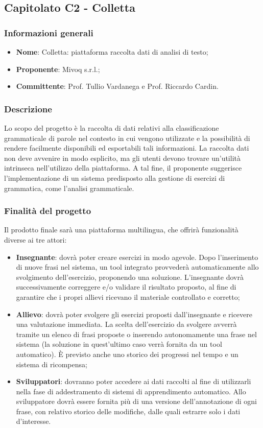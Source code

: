 \subsection{Capitolato C2 - Colletta}
\subsubsection{Informazioni generali}
\begin{itemize}
	\item \textbf{Nome}: Colletta: piattaforma raccolta dati di analisi di testo;
	\item \textbf{Proponente}: Mivoq s.r.l.;
	\item \textbf{Committente}: Prof. Tullio Vardanega e Prof. Riccardo Cardin.
\end{itemize}

\subsubsection{Descrizione}
Lo scopo del progetto è la raccolta di dati relativi alla classificazione grammaticale di parole nel
contesto in cui vengono utilizzate e la possibilità di rendere facilmente disponibili ed esportabili
tali informazioni. La raccolta dati non deve avvenire in modo esplicito, ma gli utenti devono
trovare un’utilità intrinseca nell’utilizzo della piattaforma. A tal fine, il proponente suggerisce
l’implementazione di un sistema predisposto alla gestione di esercizi di grammatica, come l’analisi grammaticale. 

 
\subsubsection{Finalità del progetto}
Il prodotto finale sarà una piattaforma multilingua, che offrirà funzionalità diverse ai tre attori:

\begin{itemize}
	\item \textbf{Insegnante}: dovrà poter creare esercizi in modo agevole. Dopo l'inserimento di nuove frasi
	 nel sistema, un tool integrato provvederà automaticamente allo svolgimento
	 dell'esercizio, proponendo una soluzione. L'insegnante dovrà 
	 successivamente correggere e/o validare il risultato proposto, al fine di
	 garantire che i propri allievi ricevano il materiale controllato e corretto;
	\item \textbf{Allievo}:
	dovrà poter svolgere gli esercizi proposti
	dall'insegnante e ricevere una valutazione immediata. La scelta
	dell'esercizio da svolgere avverrà tramite un elenco di frasi proposte o
	inserendo autonomamente una frase nel sistema (la soluzione in quest'ultimo caso verrà fornita da un tool automatico). \`E previsto
    anche uno storico dei progressi nel tempo e un sistema di ricompensa;
	\item \textbf{Sviluppatori}: dovranno poter accedere ai dati
	raccolti al fine di utilizzarli nella fase di addestramento di sistemi di apprendimento automatico. Allo sviluppatore dovrà essere fornita più di una versione dell'annotazione di ogni frase, con relativo storico delle modifiche, dalle quali estrarre solo i dati d'interesse.
\end{itemize}
